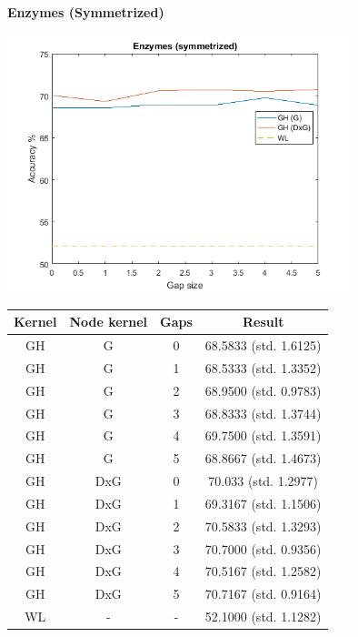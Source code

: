 \documentclass{article}
\begin{document}
\textbf{Enzymes (Symmetrized)}\\
\begin{minipage}{0.6\linewidth}
	\hspace*{-1in}
	\includegraphics[width=10cm]{enzymes_symmetrized}
	\label{fig:enzymes_symmetrized}
\end{minipage}
\begin{minipage}[c]{0.5\linewidth}
	
	\centering
	\begin{tabular}{c|c|c|c}
		Kernel & Node kernel & Gaps & Result\\
		\hline
		GH & G & 0 & 68.5833 (std. 1.6125)\\
		GH & G & 1 & 68.5333 (std. 1.3352)\\
		GH & G & 2 & 68.9500 (std. 0.9783)\\
		GH & G & 3 & 68.8333 (std. 1.3744)\\
		GH & G & 4 & 69.7500 (std. 1.3591)\\
		GH & G & 5 & 68.8667 (std. 1.4673)\\
		GH & DxG & 0 & 70.033 (std. 1.2977)\\
		GH & DxG & 1 & 69.3167 (std. 1.1506)\\
		GH & DxG & 2 & 70.5833 (std. 1.3293)\\
		GH & DxG & 3 & 70.7000 (std. 0.9356)\\
		GH & DxG & 4 & 70.5167 (std. 1.2582)\\
		GH & DxG & 5 & 70.7167 (std. 0.9164)\\
		WL & - & - & 52.1000 (std. 1.1282)
	\end{tabular}
	\label{table:enzymes_symmetrized}
\end{minipage}
\end{document}

